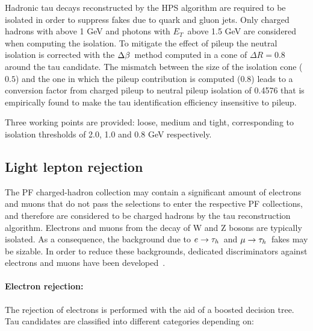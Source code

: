 Hadronic tau decays reconstructed by the HPS algorithm are %
required to be isolated in order to suppress fakes due to quark and gluon jets. Only charged hadrons with \pT above 1 GeV and photons with $E_T$\ above 1.5 GeV are considered when computing the isolation. To mitigate the effect of pileup the neutral isolation is corrected with the $\Delta\beta$\ method computed in a cone of $\Delta R = 0.8$ around the tau candidate. The mismatch between the size of the isolation cone ($0.5$) and the one in which the pileup contribution is computed (0.8) leads to a conversion factor from charged pileup to neutral pileup isolation of 0.4576 that is empirically found to make the tau identification efficiency insensitive to pileup.

Three working points are provided: loose, medium and tight, corresponding to isolation thresholds of 2.0, 1.0 and 0.8 GeV respectively.


\subsection{Light lepton rejection}

The PF charged-hadron collection may contain a significant amount of electrons and muons that do not pass the selections to enter the respective PF collections, and therefore are considered to be charged hadrons by the tau reconstruction algorithm. Electrons and muons from the decay of W and Z bosons are typically isolated. 
As a consequence, the background due to $e\rightarrow\tau_h$\ and $\mu\rightarrow\tau_h$\ fakes may be sizable. %
In order to reduce these backgrounds, dedicated discriminators against electrons and muons have been developed~\cite{AN-12-417}.

\paragraph{Electron rejection:} The rejection of electrons is performed with the aid of a boosted decision tree. Tau candidates are classified into different categories depending on:

